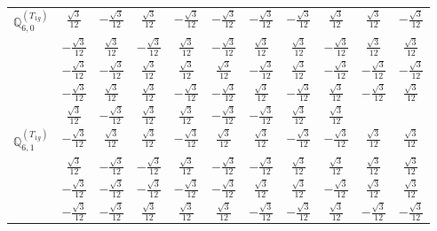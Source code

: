 \documentclass[fleqn,10pt,landscape]{article}
\begin{document}
\begin{itemize}
{\begin{center}
\begin{longtable}{ccccccccccc}
$\mathbb{Q}_{6,0}^{(T_{1g})}$ & $ \frac{\sqrt{3}}{12} $ & $ - \frac{\sqrt{3}}{12} $ & $ \frac{\sqrt{3}}{12} $ & $ - \frac{\sqrt{3}}{12} $ & $ - \frac{\sqrt{3}}{12} $ & $ - \frac{\sqrt{3}}{12} $ & $ - \frac{\sqrt{3}}{12} $ & $ \frac{\sqrt{3}}{12} $ & $ \frac{\sqrt{3}}{12} $ & $ - \frac{\sqrt{3}}{12} $ \\
& $ - \frac{\sqrt{3}}{12} $ & $ \frac{\sqrt{3}}{12} $ & $ - \frac{\sqrt{3}}{12} $ & $ \frac{\sqrt{3}}{12} $ & $ - \frac{\sqrt{3}}{12} $ & $ \frac{\sqrt{3}}{12} $ & $ \frac{\sqrt{3}}{12} $ & $ - \frac{\sqrt{3}}{12} $ & $ \frac{\sqrt{3}}{12} $ & $ \frac{\sqrt{3}}{12} $ \\
& $ - \frac{\sqrt{3}}{12} $ & $ - \frac{\sqrt{3}}{12} $ & $ \frac{\sqrt{3}}{12} $ & $ \frac{\sqrt{3}}{12} $ & $ \frac{\sqrt{3}}{12} $ & $ - \frac{\sqrt{3}}{12} $ & $ \frac{\sqrt{3}}{12} $ & $ - \frac{\sqrt{3}}{12} $ & $ - \frac{\sqrt{3}}{12} $ & $ - \frac{\sqrt{3}}{12} $ \\
& $ - \frac{\sqrt{3}}{12} $ & $ \frac{\sqrt{3}}{12} $ & $ \frac{\sqrt{3}}{12} $ & $ - \frac{\sqrt{3}}{12} $ & $ - \frac{\sqrt{3}}{12} $ & $ \frac{\sqrt{3}}{12} $ & $ - \frac{\sqrt{3}}{12} $ & $ \frac{\sqrt{3}}{12} $ & $ - \frac{\sqrt{3}}{12} $ & $ \frac{\sqrt{3}}{12} $ \\
& $ \frac{\sqrt{3}}{12} $ & $ - \frac{\sqrt{3}}{12} $ & $ \frac{\sqrt{3}}{12} $ & $ \frac{\sqrt{3}}{12} $ & $ - \frac{\sqrt{3}}{12} $ & $ - \frac{\sqrt{3}}{12} $ & $ \frac{\sqrt{3}}{12} $ & $ \frac{\sqrt{3}}{12} $ & $  $ & $  $ \\ \hline
$\mathbb{Q}_{6,1}^{(T_{1g})}$ & $ - \frac{\sqrt{3}}{12} $ & $ \frac{\sqrt{3}}{12} $ & $ \frac{\sqrt{3}}{12} $ & $ - \frac{\sqrt{3}}{12} $ & $ \frac{\sqrt{3}}{12} $ & $ \frac{\sqrt{3}}{12} $ & $ - \frac{\sqrt{3}}{12} $ & $ - \frac{\sqrt{3}}{12} $ & $ \frac{\sqrt{3}}{12} $ & $ \frac{\sqrt{3}}{12} $ \\
& $ \frac{\sqrt{3}}{12} $ & $ - \frac{\sqrt{3}}{12} $ & $ - \frac{\sqrt{3}}{12} $ & $ \frac{\sqrt{3}}{12} $ & $ - \frac{\sqrt{3}}{12} $ & $ - \frac{\sqrt{3}}{12} $ & $ \frac{\sqrt{3}}{12} $ & $ \frac{\sqrt{3}}{12} $ & $ \frac{\sqrt{3}}{12} $ & $ \frac{\sqrt{3}}{12} $ \\
& $ - \frac{\sqrt{3}}{12} $ & $ - \frac{\sqrt{3}}{12} $ & $ - \frac{\sqrt{3}}{12} $ & $ - \frac{\sqrt{3}}{12} $ & $ - \frac{\sqrt{3}}{12} $ & $ \frac{\sqrt{3}}{12} $ & $ \frac{\sqrt{3}}{12} $ & $ - \frac{\sqrt{3}}{12} $ & $ \frac{\sqrt{3}}{12} $ & $ \frac{\sqrt{3}}{12} $ \\
& $ - \frac{\sqrt{3}}{12} $ & $ - \frac{\sqrt{3}}{12} $ & $ \frac{\sqrt{3}}{12} $ & $ \frac{\sqrt{3}}{12} $ & $ \frac{\sqrt{3}}{12} $ & $ - \frac{\sqrt{3}}{12} $ & $ - \frac{\sqrt{3}}{12} $ & $ \frac{\sqrt{3}}{12} $ & $ - \frac{\sqrt{3}}{12} $ & $ - \frac{\sqrt{3}}{12} $ \\

\end{longtable}
\end{center}}
\end{itemize}
\end{document}
